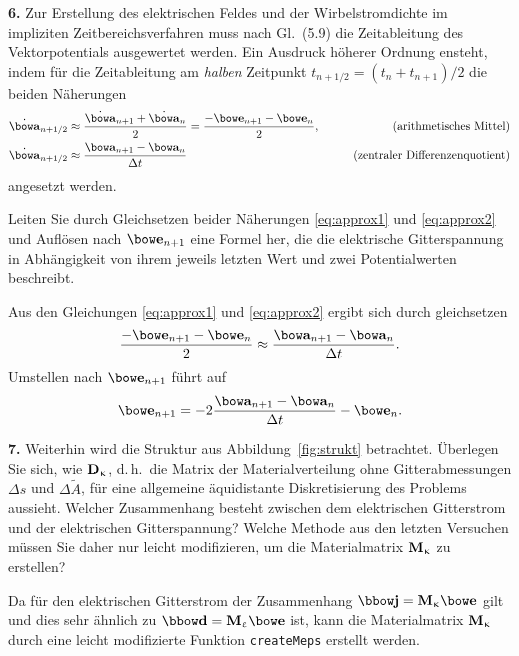 \documentclass[Protokollheft.tex]{subfiles}
\begin{document}
\begin{framed}
	\noindent \textbf{6.}\label{loop}
      Zur Erstellung des elektrischen Feldes und der Wirbelstromdichte
      im impliziten Zeitbereichsverfahren muss nach Gl.~(5.9) die
      Zeitableitung des Vektorpotentials ausgewertet werden.
      Ein Ausdruck höherer Ordnung ensteht, indem für die
      Zeitableitung am \emph{halben} Zeitpunkt $t_{n+1/2}=(t_n+t_{n+1})/2$
      die beiden Näherungen
      \begin{align}\label{eq:approx1}
        \dot{\afit}_{n+1/2} &\approx \frac{\dot{\afit}_{n+1}+\dot{\afit}_n}{2} = \frac{-\efit_{n+1} - \efit_{n}}{2}, &\qquad\mbox{(arithmetisches Mittel)}\\
        \label{eq:approx2} \dot{\afit}_{n+1/2} &\approx \frac{\afit_{n+1} - \afit_{n}}{\Delta t} &\qquad\mbox{(zentraler Differenzenquotient)}
      \end{align}
      angesetzt werden.
    
      Leiten Sie durch Gleichsetzen beider Näherungen \eqref{eq:approx1} und \eqref{eq:approx2} und Auflösen nach
      $\efit_{n+1}$ eine Formel her, die die elektrische Gitterspannung
      in Abhängigkeit von ihrem jeweils letzten Wert und zwei
      Potentialwerten beschreibt.\label{exer:formulaEfit4pots}
\end{framed}
\noindent
Aus den Gleichungen \ref{eq:approx1} und \ref{eq:approx2} ergibt sich durch gleichsetzen
\begin{equation}
	\frac{-\efit_{n+1} - \efit_{n}}{2} \approx \frac{\afit_{n+1} - \afit_{n}}{\Delta t}.
\end{equation}
Umstellen nach $\efit_{n+1}$ führt auf
\begin{equation}
	\efit_{n+1} = -2\frac{\afit_{n+1}-\afit_{n}}{\Delta t} - \efit_{n}.
\end{equation}
\begin{framed}
	\noindent \textbf{7.} Weiterhin wird die Struktur aus Abbildung~\ref{fig:strukt} betrachtet. Überlegen Sie sich, wie
      $\mathbf{D}_{\upkappa}$, d.\,h.\ die Matrix der Materialverteilung ohne Gitterabmessungen $\Delta s$ und $\Delta \widetilde{A}$, für eine allgemeine äquidistante Diskretisierung des Problems aussieht. Welcher Zusammenhang besteht zwischen dem elektrischen Gitterstrom und der elektrischen Gitterspannung? Welche Methode aus den letzten Versuchen
      müssen Sie daher nur leicht modifizieren, um die Materialmatrix $\mathbf{M}_{\upkappa}$ zu erstellen?
      \label{exer:calcDkap}
\end{framed}
\noindent
Da für den elektrischen Gitterstrom der Zusammenhang $\jfit = \Mkap \efit$ gilt und dies sehr ähnlich zu $\dfit = \Meps \efit$ ist, kann die Materialmatrix $\mathbf{M}_{\upkappa}$ durch eine leicht modifizierte Funktion \lstinline{createMeps} erstellt werden. 
\\
\end{document}
